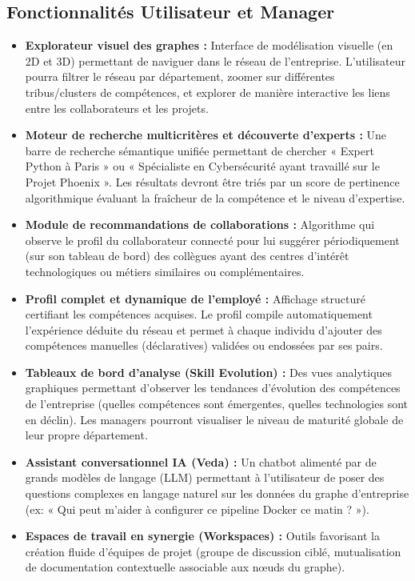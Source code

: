 \documentclass[12pt,a4paper]{article}
\begin{document}
\subsection{Fonctionnalités Utilisateur et Manager}
\begin{itemize}[leftmargin=*]
    \item \textbf{Explorateur visuel des graphes :} Interface de modélisation visuelle (en 2D et 3D) permettant de naviguer dans le réseau de l'entreprise. L'utilisateur pourra filtrer le réseau par département, zoomer sur différentes tribus/clusters de compétences, et explorer de manière interactive les liens entre les collaborateurs et les projets.
    \item \textbf{Moteur de recherche multicritères et découverte d'experts :} Une barre de recherche sémantique unifiée permettant de chercher « Expert Python à Paris » ou « Spécialiste en Cybersécurité ayant travaillé sur le Projet Phoenix ». Les résultats devront être triés par un score de pertinence algorithmique évaluant la fraîcheur de la compétence et le niveau d'expertise.
    \item \textbf{Module de recommandations de collaborations :} Algorithme qui observe le profil du collaborateur connecté pour lui suggérer périodiquement (sur son tableau de bord) des collègues ayant des centres d'intérêt technologiques ou métiers similaires ou complémentaires.
    \item \textbf{Profil complet et dynamique de l'employé :} Affichage structuré certifiant les compétences acquises. Le profil compile automatiquement l'expérience déduite du réseau et permet à chaque individu d'ajouter des compétences manuelles (déclaratives) validées ou endossées par ses pairs.
    \item \textbf{Tableaux de bord d'analyse (Skill Evolution) :} Des vues analytiques graphiques permettant d'observer les tendances d'évolution des compétences de l'entreprise (quelles compétences sont émergentes, quelles technologies sont en déclin). Les managers pourront visualiser le niveau de maturité globale de leur propre département.
    \item \textbf{Assistant conversationnel IA (Veda) :} Un chatbot alimenté par de grands modèles de langage (LLM) permettant à l'utilisateur de poser des questions complexes en langage naturel sur les données du graphe d'entreprise (ex: « Qui peut m'aider à configurer ce pipeline Docker ce matin ? »).
    \item \textbf{Espaces de travail en synergie (Workspaces) :} Outils favorisant la création fluide d'équipes de projet (groupe de discussion ciblé, mutualisation de documentation contextuelle associable aux nœuds du graphe).
\end{itemize}
\end{document}
